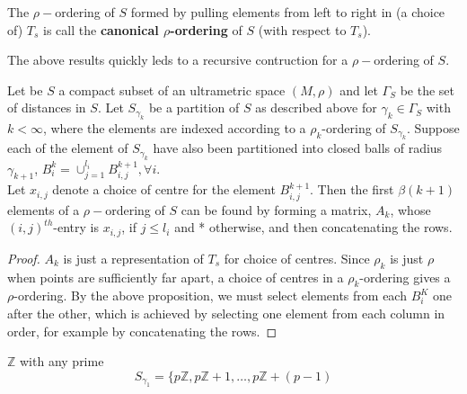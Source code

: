 \begin{proposition*}
\begin{definition*}
The $\rho-$ordering of $S$ formed by pulling elements from left to right in (a choice of) $T_s$ is call the \textbf{canonical $\rho$-ordering} of $S$ (with respect to $T_s$).
\end{definition*}

The above results quickly leds to a recursive contruction for a $\rho-$ordering of $S$.

\begin{proposition*}
Let be $S$ a compact subset of an ultrametric space $(M, \rho)$ and let $\Gamma_S$ be the set of distances in $S$. Let $S_{\gamma_k}$ be a partition of $S$ as described above for $\gamma_k \in \Gamma_S$ with $k < \infty$, where the elements are indexed according to a $\rho_k$-ordering of $S_{\gamma_k}$. Suppose each of the element of $S_{\gamma_k}$ have also been partitioned into closed balls of radius $\gamma_{k+1}$, $B^k_i =\cup_{j=1}^{l_i} B^{k+1}_{i,j}, \forall i$.\\

Let $x_{i,j}$ denote a choice of centre for the element $B^{k+1}_{i,j}$. Then the first $\beta(k+1)$ elements of a $\rho-$ordering of $S$ can be found by forming a matrix, $A_k$, whose $(i,j)^{th}$-entry is $x_{i,j}$, if $j \leq l_i$ and * otherwise, and then concatenating the rows.
\end{proposition*}


\begin{proof}
$A_k$ is just a representation of $T_s$ for choice of centres. Since $\rho_k$ is just $\rho$ when points are sufficiently far apart, a choice of centres in a $\rho_k$-ordering gives a $\rho$-ordering. By the above proposition, we must select elements from each $B^K_i$ one after the other, which is achieved by selecting one element from each column in order, for example by concatenating the rows. 

\end{proof}

\begin{example}
$\mathbb{Z}$ with any prime
\[S_{\gamma_1} = \{p\mathbb{Z}, p\mathbb{Z} +1, \ldots, p\mathbb{Z} + (p-1)\]


\end{example}
\end{proposition*}
